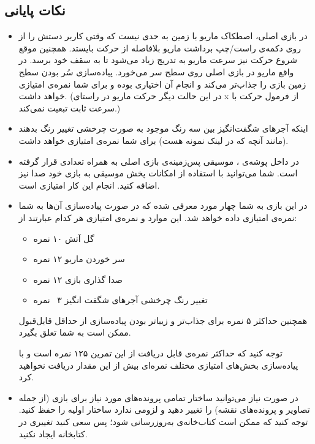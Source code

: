 \documentclass{utap}
\begin{document}
	\subsection{نکات پایانی}
	\begin{itemize}
		\item
در بازی اصلی، اصطکاک ماریو با زمین به حدی نیست که وقتی کاربر دستش را از روی دکمه‌ی راست/چپ برداشت ماریو بلافاصله از حرکت بایستد. همچنین موقع شروع حرکت نیز سرعت ماریو به تدریج زیاد می‌شود تا به سقف خود برسد. در واقع ماریو در بازی اصلی روی سطح سر می‌خورد. پیاده‌سازی سُر بودن سطح زمین بازی را جذاب‌تر می‌کند و انجام آن اختیاری بوده و برای شما نمره‌ی امتیازی خواهد داشت. (در این حالت دیگر حرکت ماریو در راستای x از فرمول حرکت با سرعت ثابت تبعیت نمی‌کند.)
		\item
اینکه آجر‌های شگفت‌انگیز بین سه رنگ موجود به صورت چرخشی تغییر رنگ بدهند (مانند آنچه که در لینک نمونه هست) برای شما نمره‌ی امتیازی خواهد داشت.
	\item
	در داخل پوشه‌ی ، موسیقی پس‌زمینه‌ی بازی اصلی به همراه تعدادی  قرار گرفته است. شما می‌توانید با استفاده از امکانات پخش موسیقی  به بازی خود صدا نیز اضافه کنید. انجام این کار امتیازی است.
	\item
	در این بازی به شما چهار مورد معرفی شده که در صورت پیاده‌سازی آن‌ها به شما نمره‌ی امتیازی داده خواهد شد. این موارد و نمره‌ی امتیازی هر کدام عبارتند از:
    \begin{itemize}
\item گل آتش \dotfill ۱۰ نمره
\item سر خوردن ماریو \dotfill ۱۲ نمره
\item صدا گذاری بازی \dotfill ۱۲ نمره
\item تغییر رنگ چرخشی آجر‌های شگفت انگیز \dotfill ۳~ نمره
    \end{itemize}
همچنین حداکثر ۵ نمره برای جذاب‌تر و زیباتر بودن پیاده‌سازی از حداقل قابل‌قبول ممکن است به شما تعلق بگیرد.

توجه کنید که حداکثر نمره‌ی قابل دریافت از این تمرین ۱۲۵ نمره است و با پیاده‌سازی بخش‌های امتیازی مختلف نمره‌ای بیش از این مقدار دریافت نخواهید کرد.
		\item
در صورت نیاز می‌توانید ساختار تمامی پرونده‌های مورد نیاز برای بازی (از جمله تصاویر و پرونده‌های نقشه) را تغییر دهید و لزومی ندارد ساختار اولیه را حفظ کنید.
توجه کنید که ممکن است کتاب‌خانه‌ی  به‌روزرسانی شود؛ پس سعی کنید تغییری در کتابخانه ایجاد نکنید.
	
	\end{itemize}
\end{document}
